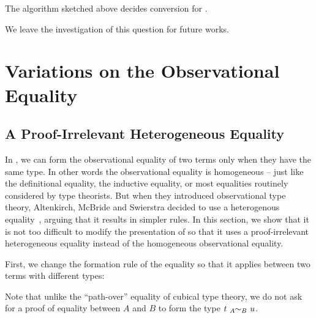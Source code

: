 \begin{conjecture}
  The algorithm sketched above decides conversion for \SetoidCCplus.
\end{conjecture}

We leave the investigation of this question for future works.

\section{Variations on the Observational Equality}
\label{sec:heterogeneous}

\subsection{A Proof-Irrelevant Heterogeneous Equality}

In \SetoidCC, we can form the observational 
equality of two terms only when they have the same type. 
% 
In other words the observational equality is homogeneous -- just like the 
definitional equality, the inductive equality, or most equalities routinely 
considered by type theorists.
% 
But when they introduced observational type theory, Altenkirch, McBride and 
Swierstra decided to use a heterogenous 
equality~, arguing that it results in simpler
rules.
% 
In this section, we show that it is not too difficult to modify the 
presentation of \SetoidCC so that it uses a proof-irrelevant heterogeneous 
equality instead of the homogeneous observational equality.

% 
First, we change the formation rule of the equality so that it applies between
two terms with different types:
% 

Note that unlike the ``path-over'' equality of cubical type theory, we do not 
ask for a proof of equality between \( A \) and \( B \) to form the type
\( \Heteq{t}{A}{u}{B} \).

